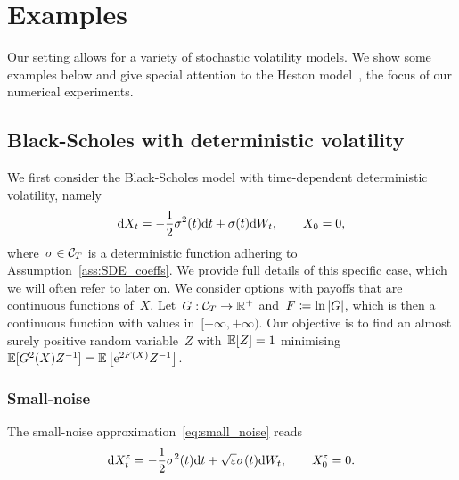 \section{Examples}\label{sec:Examples}
Our setting allows for a variety of stochastic volatility models. 
We show some examples below
and give special attention to the Heston model~\cite{Heston1993AOptions}, the focus of our numerical experiments. 


\subsection{Black-Scholes with deterministic volatility}\label{sec:BS}
We first consider the Black-Scholes model with
time-dependent deterministic volatility, namely
$$
\mathrm{d} X_t = -\frac{1}{2}\sigma^2(t) \mathrm{d} t + \sigma(t) \mathrm{d} W_t, \qquad X_0 = 0,
$$
where~$\sigma\in \mathcal{C}_T$ is a deterministic function adhering to Assumption~\ref{ass:SDE_coeffs}. 
We provide full details of this specific case, 
which we will often refer to later on.
We consider options with payoffs that are continuous functions of~$X$. 
Let~$G:\mathcal{C}_{T}\rightarrow\mathbb{R}^+$ and~$F \coloneqq \ln|G|$, 
which is then a continuous function with values in~$[-\infty,+\infty)$. %
Our objective is to find an almost surely positive random variable~$Z$ with~$\mathbb{E}[Z] = 1$ minimising~$\mathbb{E}[G^2(X)Z^{-1}] = \mathbb{E}\left[\mathrm{e}^{2F(X)}Z^{-1}\right]$.

\subsubsection{Small-noise}
The small-noise approximation~\eqref{eq:small_noise} reads
$$
\mathrm{d} X_t^{\varepsilon} = -\frac{1}{2}\sigma^2(t)\mathrm{d} t + \sqrt{\varepsilon}\sigma(t) \mathrm{d} W_t, \qquad X_0 ^{\varepsilon} = 0.
$$

